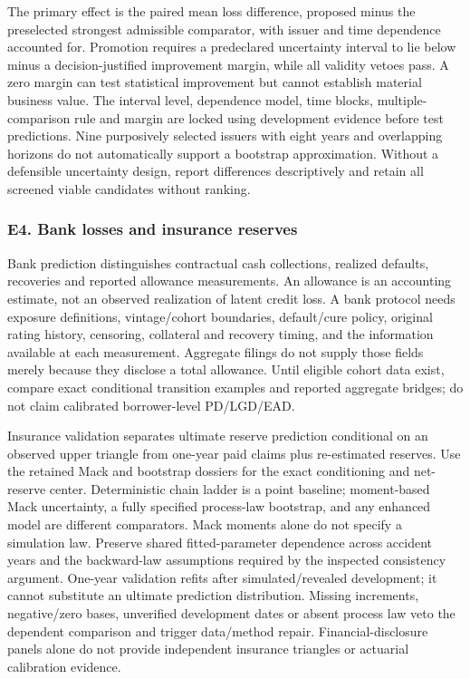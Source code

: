 The primary effect is the paired mean loss difference, proposed minus the preselected strongest admissible comparator, with issuer and time dependence accounted for. Promotion requires a predeclared uncertainty interval to lie below minus a decision-justified improvement margin, while all validity vetoes pass. A zero margin can test statistical improvement but cannot establish material business value. The interval level, dependence model, time blocks, multiple-comparison rule and margin are locked using development evidence before test predictions. Nine purposively selected issuers with eight years and overlapping horizons do not automatically support a bootstrap approximation. Without a defensible uncertainty design, report differences descriptively and retain all screened viable candidates without ranking.

\hypertarget{e4.-bank-losses-and-insurance-reserves}{%
\subsubsection{E4. Bank losses and insurance reserves}\label{e4.-bank-losses-and-insurance-reserves}}

Bank prediction distinguishes contractual cash collections, realized defaults, recoveries and reported allowance measurements. An allowance is an accounting estimate, not an observed realization of latent credit loss. A bank protocol needs exposure definitions, vintage/cohort boundaries, default/cure policy, original rating history, censoring, collateral and recovery timing, and the information available at each measurement. Aggregate filings do not supply those fields merely because they disclose a total allowance. Until eligible cohort data exist, compare exact conditional transition examples and reported aggregate bridges; do not claim calibrated borrower-level PD/LGD/EAD.

Insurance validation separates ultimate reserve prediction conditional on an observed upper triangle from one-year paid claims plus re-estimated reserves. Use the retained Mack and bootstrap dossiers for the exact conditioning and net-reserve center. Deterministic chain ladder is a point baseline; moment-based Mack uncertainty, a fully specified process-law bootstrap, and any enhanced model are different comparators. Mack moments alone do not specify a simulation law. Preserve shared fitted-parameter dependence across accident years and the backward-law assumptions required by the inspected consistency argument. One-year validation refits after simulated/revealed development; it cannot substitute an ultimate prediction distribution. Missing increments, negative/zero bases, unverified development dates or absent process law veto the dependent comparison and trigger data/method repair. Financial-disclosure panels alone do not provide independent insurance triangles or actuarial calibration evidence.

